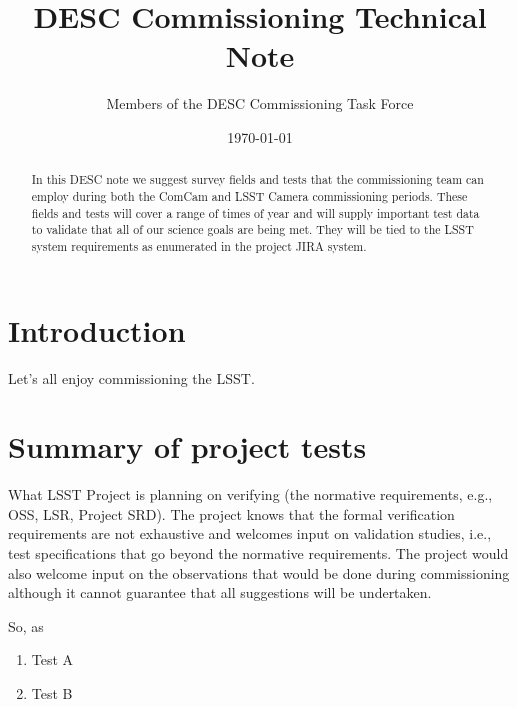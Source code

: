 \documentclass[modern]{desc-tex/styles/lsstdescnote}
\begin{document}
\title{DESC Commissioning Technical Note}
\author{Members of the DESC Commissioning Task Force}
\date{\today}

\begin{abstract}
  In this DESC note we suggest survey fields and tests that the
  commissioning team can employ during both the ComCam and LSST Camera
  commissioning periods.  These fields and tests will cover a range of
  times of year and will supply important test data to validate that
  all of our science goals are being met.  They will be tied to the
  LSST system requirements as enumerated in the project JIRA system.
\end{abstract}

\maketitle

\noindent
\begin{center}
  \fboxsep=5pt  
 \end{center} 
\vspace{0.1in}

\section{Introduction}

Let's all enjoy commissioning the LSST.

\section{Summary of project tests}

What LSST Project is planning on verifying (the normative requirements, e.g., OSS, LSR, Project SRD). The project knows that the formal verification requirements are not exhaustive and welcomes input on validation studies, i.e., test specifications that go beyond the normative requirements. The project would also welcome input on the observations that would be done during commissioning although it cannot guarantee that all suggestions will be undertaken.

So, as 

\begin{enumerate}
\item Test A
\item Test B
\end{enumerate}
\end{document}
